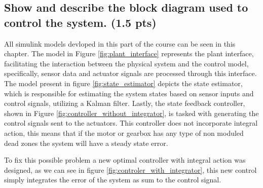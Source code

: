 \subsection{Show and describe the block diagram used to control the system. (1.5 pts)}
\vspace{10pt}


All simulink models devloped in this part of the course can be seen in this chapter. The model in Figure \ref{fig:plant_interface} represents the plant interface, facilitating the interaction between the physical system and the control model, specifically, sensor data and actuator signals are processed through this interface. The model present in figure \ref{fig:state_estimator} depicts the state estimator, which is responsible for estimating the system states based on sensor inputs and control signals, utilizing a Kalman filter. Lastly, the state feedback controller, shown in Figure \ref{fig:controller_without_integrator}, is tasked with generating the control signals sent to the actuators. This controller does not incorporate integral action, this means that if the motor or gearbox has any type of non moduled dead zones the system will have a steady state error.

To fix this possible problem a new optimal controller with integral action was designed, as we can see in figure \ref{fig:controler_with_integrator}, this new control simply integrates the error of the system as sum to the control signal.


